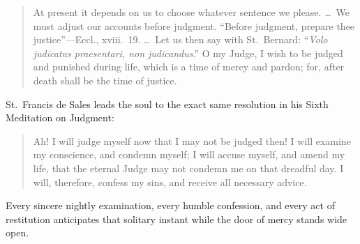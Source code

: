 \begin{quote}
At present it depends on us to choose whatever sentence we please. \dots\ We must adjust our accounts before judgment. ``Before judgment, prepare thee justice''---Eccl., xviii.\ 19. \dots\ Let us then say with St.\ Bernard: ``\textit{Volo judicatus praesentari, non judicandus}.'' O my Judge, I wish to be judged and punished during life, which is a time of mercy and pardon; for, after death shall be the time of justice.
\end{quote}

St.\ Francis de Sales leads the soul to the exact same resolution in his Sixth Meditation on Judgment:

\begin{quote}
Ah! I will judge myself now that I may not be judged then! I will examine my conscience, and condemn myself; I will accuse myself, and amend my life, that the eternal Judge may not condemn me on that dreadful day. I will, therefore, confess my sins, and receive all necessary advice.
\end{quote}

Every sincere nightly examination, every humble confession, and every act of restitution anticipates that solitary instant while the door of mercy stands wide open.
